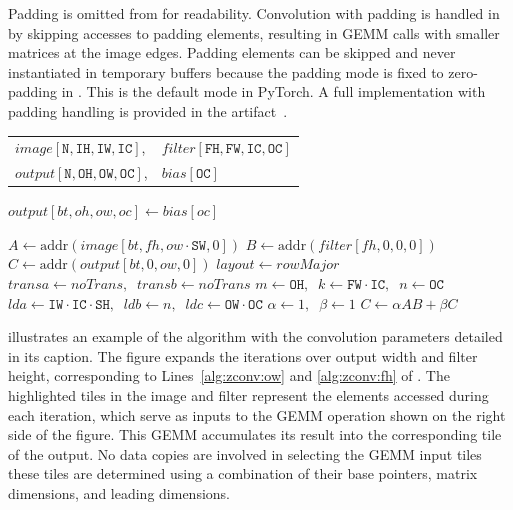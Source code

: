 Padding is omitted from  for readability.
Convolution with padding is handled in \algname by skipping accesses to padding elements, resulting in GEMM calls with smaller matrices at the image edges.
Padding elements can be skipped and never instantiated in temporary buffers because the padding mode is fixed to zero-padding in \algname.
This is the default mode in PyTorch.
A full implementation with padding handling is provided in the artifact~\cite{zconvartifact}.

\begin{algorithm}[t]
\caption{\algname (padding omitted for brevity).}
\label{alg:zconv}
\small
\begin{algorithmic}[1]
\Require
\begin{tabular}[t]{@{}ll@{}}
  $image[\texttt{N},\texttt{IH},\texttt{IW},\texttt{IC}]$, & $filter[\texttt{FH},\texttt{FW},\texttt{IC},\texttt{OC}]$ \\
  $output[\texttt{N},\texttt{OH},\texttt{OW},\texttt{OC}]$, & $bias[\texttt{OC}]$
\end{tabular}

 
    \label{alg:zconv:ow}
       \label{alg:zconv:initialize-start}
        \State $output[bt,oh,ow,oc] \gets bias[oc]$
      \EndFor
    \EndFor  \label{alg:zconv:initialize-end}

      \label{alg:zconv:fh}
      \State $A \gets \text{addr}(image[bt, fh, ow \cdot \texttt{SW}, 0])$ \label{alg:zconv:params-start}
      \State $B \gets \text{addr}(filter[fh,0,0,0])$
      \State $C \gets \text{addr}(output[bt,0,ow,0])$
      \State $layout \gets rowMajor$
      \State $transa \gets noTrans,\;\; transb \gets noTrans$
      \State $m \gets \texttt{OH},\;\; k \gets \texttt{FW} \cdot \texttt{IC},\;\; n \gets \texttt{OC}$ \label{alg:zconv:dims}
      \State $lda \gets \texttt{IW} \cdot \texttt{IC} \cdot \texttt{SH},\;\; ldb \gets n,\;\; ldc \gets \texttt{OW} \cdot \texttt{OC}$
      \State $\alpha \gets 1,\;\; \beta \gets 1$ \label{alg:zconv:params-end}
      \State $C \gets \alpha A B + \beta C$
    \EndFor
  \EndFor
\EndFor
\end{algorithmic}
\end{algorithm}

 illustrates an example of the \algname algorithm with the convolution parameters detailed in its caption.
The figure expands the iterations over output width and filter height, corresponding to Lines~\ref{alg:zconv:ow} and \ref{alg:zconv:fh} of .
The highlighted tiles in the image and filter represent the elements accessed during each iteration, which serve as inputs to the GEMM operation shown on the right side of the figure.
This GEMM accumulates its result into the corresponding tile of the output.
No data copies are involved in selecting the GEMM input tiles \textemdash these tiles are determined using a combination of their base pointers, matrix dimensions, and leading dimensions.


